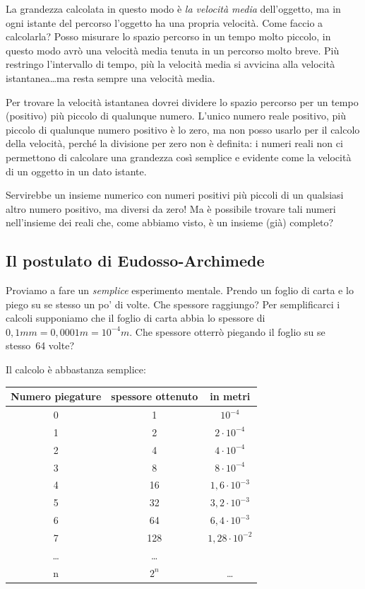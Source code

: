 La grandezza calcolata in questo modo è \emph{la velocità media} 
dell'oggetto, 
ma in ogni istante del percorso l'oggetto ha una propria velocità. Come 
faccio 
a calcolarla? Posso misurare lo spazio percorso in un tempo molto piccolo, 
in questo modo avrò una velocità media tenuta in un percorso molto breve. 
Più restringo l'intervallo di tempo, più la velocità media si avvicina alla 
velocità istantanea\dots ma resta sempre una velocità media. 

Per trovare la velocità istantanea dovrei dividere lo spazio percorso per un 
tempo (positivo) più piccolo di qualunque numero. L'unico numero reale
positivo, più piccolo di qualunque numero positivo è lo zero, ma 
non posso usarlo per il calcolo della velocità, perché la divisione per 
zero non è definita: i numeri reali non ci permettono di calcolare una 
grandezza così semplice e evidente come la velocità di un oggetto in un dato 
istante.

Servirebbe un insieme numerico con numeri positivi più piccoli di un 
qualsiasi altro numero positivo, ma diversi da zero! Ma è possibile 
trovare tali numeri nell'insieme dei reali che, come abbiamo visto, 
è un insieme (già) completo?

\subsection{Il postulato di Eudosso-Archimede}
\label{subsec:insnum_eudossoarchimede}

Proviamo a fare un \emph{semplice} esperimento mentale. Prendo un foglio di 
carta e lo piego su se stesso un po' di volte. Che spessore raggiungo?
Per semplificarci i calcoli supponiamo che il foglio di carta abbia lo 
spessore 
di $0,1mm = 0,0001m = 10^{-4}m$. 
Che spessore otterrò piegando il foglio su se stesso~64 volte?

Il calcolo è abbastanza semplice:

\begin{center}
 \begin{tabular}{ccc}
\toprule
Numero piegature & spessore ottenuto & in metri\\
\midrule
0 & 1 & $10^{-4}$\\
1 & 2 & $2 \cdot 10^{-4}$\\
2 & 4 & $4 \cdot 10^{-4}$\\
3 & 8 & $8 \cdot 10^{-4}$\\
4 & 16 & $1,6 \cdot 10^{-3}$\\
5 & 32 & $3,2 \cdot 10^{-3}$\\
6 & 64 & $6,4 \cdot 10^{-3}$\\
7 & 128 & $1,28 \cdot 10^{-2}$\\
\ldots& \ldots\\
n & $2^n$ & \ldots\\
\bottomrule
\end{tabular}
\end{center}

